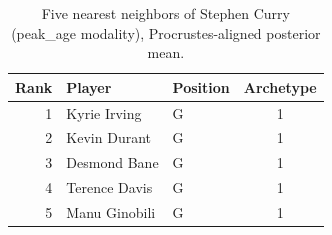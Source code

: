 \begin{table}[htbp]
  \centering\small
  \begin{tabular}{rllc}
    \toprule
    Rank & Player & Position & Archetype \\
    \midrule
    1 & Kyrie Irving & G & 1 \\
    2 & Kevin Durant & G & 1 \\
    3 & Desmond Bane & G & 1 \\
    4 & Terence Davis & G & 1 \\
    5 & Manu Ginobili & G & 1 \\
    \bottomrule
  \end{tabular}
  \caption{Five nearest neighbors of Stephen Curry (peak_age modality), Procrustes-aligned posterior mean.}
  \label{tab:Stephen_Curry_neighbors_peak_age}
\end{table}

